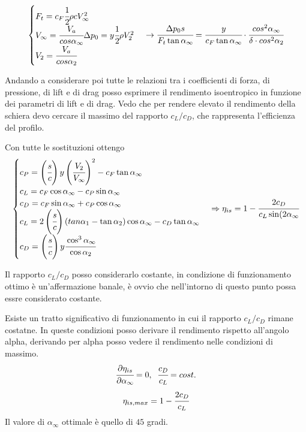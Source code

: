 \begin{equation}
\begin{cases}
F_t = c_F \cfrac{1}{2} \rho c V_{\infty}^2\\
V_{\infty} = \cfrac{V_a}{cos \alpha_{\infty}}
\Delta p_0 = y \cfrac{1}{2} \rho V_2^2\\
V_2 = \cfrac{V_a}{cos \alpha_2}
\end{cases}
\rightarrow
\cfrac{\Delta p_0 s}{F_t \tan \alpha_{\infty}} = \cfrac{y}{c_F \tan \alpha_{\infty}} \cdot \cfrac{cos^2 \alpha_{\infty}}{\delta \cdot cos^2 \alpha_2}
\end{equation}


Andando a considerare poi tutte le relazioni tra i coefficienti di forza, di pressione, di lift e di drag posso esprimere il rendimento isoentropico in funzione dei parametri di lift e di drag.
Vedo che per rendere elevato il rendimento della schiera devo cercare il massimo del rapporto $c_L/c_D$, che rappresenta l'efficienza del profilo.

Con tutte le sostituzioni ottengo
\begin{equation}
\begin{cases}
c_P = \left(  \cfrac{s}{c} \right) y \left( \cfrac{V_2}{V_{\infty}}  \right)^2 - c_F \tan \alpha_{\infty}\\
c_L = c_F \cos \alpha_{\infty} - c_P \sin \alpha_{\infty}\\
c_D = c_F \sin \alpha_{\infty} + c_P \cos \alpha_{\infty}\\
c_L = 2 \left(  \cfrac{s}{c} \right) (tan \alpha_1 - \tan \alpha_2) \cos \alpha_{\infty} - c_D \tan \alpha_{\infty}\\
c_D= \left(  \cfrac{s}{c} \right) y \cfrac{\cos^3 \alpha_{\infty}}{\cos \alpha_2}
\end{cases}
\Rightarrow
\eta_{is} = 1- \cfrac{2 c_D}{c_L \sin (2 \alpha_{\infty}}
\end{equation}

Il rapporto $c_L/c_D$ posso considerarlo costante, in condizione di funzionamento ottimo è un'affermazione banale, è ovvio che nell'intorno di questo punto possa essre considerato costante. 

Esiste un tratto significativo di funzionamento in cui il rapporto $c_L/c_D$ rimane costatne. In queste condizioni posso derivare il rendimento rispetto all'angolo alpha, derivando per alpha posso vedere il rendimento nelle condizioni di massimo.
\begin{equation}
\cfrac{\partial \eta_{is}}{\partial \alpha_{\infty}} = 0, \;\; \cfrac{c_D}{c_L} = cost.
\end{equation}
\begin{equation}
\eta_{is,max} = 1- \cfrac{2 c_D}{c_L}
\end{equation}
Il valore di $\alpha_{\infty}$ ottimale è quello di $45$ gradi.


